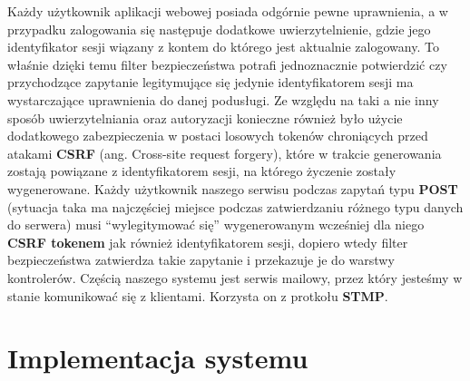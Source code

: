 \documentclass[a4paper]{article}
\begin{document}
\linebreak
Każdy użytkownik aplikacji webowej posiada odgórnie pewne uprawnienia, a w przypadku zalogowania się następuje dodatkowe uwierzytelnienie, gdzie jego identyfikator sesji wiązany z kontem do którego jest aktualnie zalogowany. To właśnie dzięki temu filter bezpieczeństwa potrafi jednoznacznie potwierdzić czy przychodzące zapytanie legitymujące się jedynie identyfikatorem sesji ma wystarczające uprawnienia do danej podusługi.
\linebreak
Ze względu na taki a nie inny sposób uwierzytelniania oraz autoryzacji konieczne również było użycie dodatkowego zabezpieczenia w postaci losowych tokenów chroniących przed atakami \textbf{CSRF} (ang. Cross-site request forgery), które w trakcie generowania zostają powiązane z identyfikatorem sesji, na którego życzenie zostały wygenerowane. Każdy użytkownik naszego serwisu podczas zapytań typu \textbf{POST} (sytuacja taka ma najczęściej miejsce podczas zatwierdzaniu różnego typu danych do serwera) musi ``wylegitymować się'' wygenerowanym wcześniej dla niego \textbf{CSRF tokenem} jak również identyfikatorem sesji, dopiero wtedy filter bezpieczeństwa zatwierdza takie zapytanie i przekazuje je do warstwy kontrolerów.
\linebreak
Częścią naszego systemu jest serwis mailowy, przez który jesteśmy w stanie komunikować się z klientami. Korzysta on z protkołu \textbf{STMP}.
\section{Implementacja systemu}
\end{document}
